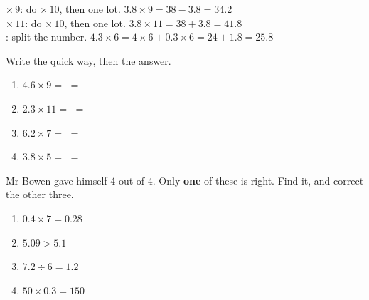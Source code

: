 \documentclass[12pt,a4paper]{article}
\newif\iffr
\newcommand{\fr}[1]{\unskip\iffr\par\vspace{1pt}\noindent{\small\itshape\color{black!60}#1}\par\fi}
\begin{document}

\begin{remember}
  $\times\, 9$: do $\times\, 10$, then  one lot. \;
  $3.8 \times 9 = 38 - 3.8 = 34.2$ \\
  $\times\, 11$: do $\times\, 10$, then  one lot. \;
  $3.8 \times 11 = 38 + 3.8 = 41.8$ \\
  : split the number. \;
  $4.3 \times 6 = 4 \times 6 + 0.3 \times 6 = 24 + 1.8 = 25.8$
  \fr{$\times\, 9$~: multiplie par 10, puis retire le nombre une fois. $\times\,
  11$~: multiplie par 10, puis ajoute-le une fois. \eng{Partitioning}~: d\'ecomposer
  le nombre en parties faciles.}
\end{remember}

\vspace{2pt}
\noindent Write the quick way, then the answer.
\fr{\'Ecris le calcul rapide, puis le r\'esultat.}

\vspace{4pt}
\begin{enumerate}[label=(\alph*), itemsep=10pt]
  \item $4.6 \times 9 = $ \blank[8.4cm] $=$ \blank[2.2cm]
  \item $2.3 \times 11 = $ \blank[8.2cm] $=$ \blank[2.2cm]
  \item $6.2 \times 7 = $ \blank[8.4cm] $=$ \blank[2.2cm]
  \item $3.8 \times 5 = $ \blank[8.4cm] $=$ \blank[2.2cm]
\end{enumerate}


\noindent Mr Bowen gave himself 4 out of 4. Only \textbf{one} of these is right. Find
it, and correct the other three.
\fr{Mr Bowen s'est mis 4 sur 4. Une seule r\'eponse est juste~: trouve-la, puis
corrige les trois autres.}

\vspace{4pt}
\begin{multicols}{2}
\begin{enumerate}[label=(\alph*), itemsep=12pt]
  \item $0.4 \times 7 = 0.28$ \; \blank[2.2cm]
  \item $5.09 > 5.1$ \; \blank[2.2cm]
  \item $7.2 \div 6 = 1.2$ \; \blank[2.2cm]
  \item $50 \times 0.3 = 150$ \; \blank[2.2cm]
\end{enumerate}
\end{multicols}
\end{document}
